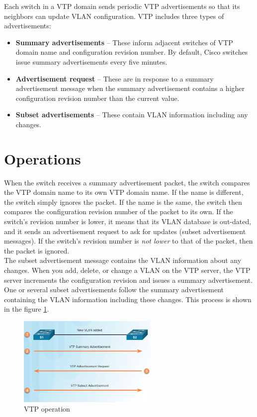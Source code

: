 Each switch in a VTP domain sends periodic VTP advertisements so that its neighbors can update VLAN configuration. VTP includes three types of advertisements:

\begin{itemize}
\item \textbf{Summary advertisements} -- These inform adjacent switches of VTP domain name and configuration revision number. By default, Cisco switches issue summary advertisements every five minutes. 
\item \textbf{Advertisement request} -- These are in response to a summary advertisement message when the summary advertisement contains a higher configuration revision number than the current value.
\item \textbf{Subset advertisements} -- These contain VLAN information including any changes.
\end{itemize}

\section{Operations}

When the switch receives a summary advertisement packet, the switch compares the VTP domain name to its own VTP domain name. If the name is different, the switch simply ignores the packet. If the name is the same, the switch then compares the configuration revision number of the packet to its own. If the switch's revision number is lower, it means that its VLAN database is out-dated, and it sends an advertisement request to ask for updates (subset advertisement messages). If the switch's revision number is \emph{not lower} to that of the packet, then the packet is ignored. \\

The subset advertisement message contains the VLAN information about any changes. When you add, delete, or change a VLAN on the VTP server, the VTP server increments the configuration revision and issues a summary advertisement. One or several subset advertisements follow the summary advertisement containing the VLAN information including these changes. This process is shown in the figure \ref{VTP-operation}.\\

\begin{figure}[hbtp]
\centering
\includegraphics[width=0.6\textwidth]{pictures/VTP-operation.png}
\caption{VTP operation}
\label{VTP-operation}
\end{figure}

